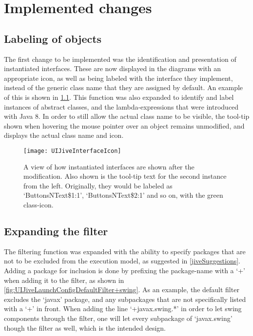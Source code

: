 \chapter{Implemented changes}\label{jiveImpl}%

\section{Labeling of objects}\label{implLabel}

The first change to be implemented was the identification and presentation of instantiated interfaces.
These are now displayed in the diagrams with an appropriate icon, as well as being labeled with the interface they implement, instead of the generic class name that they are assigned by default.
An example of this is shown in \cref{fig:JiveNewIcon}.
This function was also expanded to identify and label instances of abstract classes, and the lambda-expressions that were introduced with Java 8.
In order to still allow the actual class name to be visible, the tool-tip shown when hovering the mouse pointer over an object remains unmodified, and displays the actual class name and icon.
\begin{figure}[H]
	\centering
	\texttt{[image: UIJiveInterfaceIcon]}
	\caption[A view of how instantiated interfaces are shown after the modification.]{A view of how instantiated interfaces are shown after the modification. Also shown is the tool-tip text for the second instance from the left. Originally, they would be labeled as `ButtonsNText\$1:1', `ButtonsNText\$2:1' and so on, with the green class-icon.}
	\label{fig:JiveNewIcon}
\end{figure}

\section{Expanding the filter}\label{implFilter}

The filtering function was expanded with the ability to specify packages that are not to be excluded from the execution model, as suggested in \cref{jiveSuggestions}.
Adding a package for inclusion is done by prefixing the package-name with a `+' when adding it to the filter, as shown in \cref{fig:UIJiveLaunchConfigDefaultFilter+swing}.
As an example, the default filter excludes the `javax' package, and any subpackages that are not specifically listed with a `+' in front.
When adding the line `+javax.swing.*' in order to let swing components through the filter, one will let every subpackage of `javax.swing' though the filter as well, which is the intended design.


